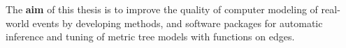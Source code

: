 



The \textbf{aim} of this thesis is to improve the quality of computer modeling of real-world events by developing methods, and software packages for automatic inference and tuning of metric tree models with functions on edges.\\

